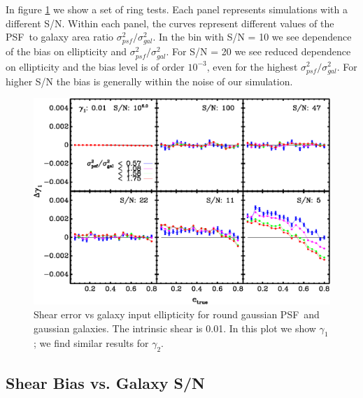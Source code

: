\documentclass[12pt,preprint]{aastex}
\newcommand{\aratio}{\ensuremath{\sigma^2_{psf}/\sigma^2_{gal}}}
\newcommand{\psf}{PSF}
\newcommand{\Rshear}{\ensuremath{\mathcal{R}}}
\newcommand{\rfracerr}{\ensuremath{\Delta \Rshear/\Rshear}}
\begin{document}
In figure \ref{fig:set-e-gg01} we show a set of ring tests.  Each panel
represents simulations with a different S/N.  Within each panel, the curves
represent different values of the \psf\ to galaxy area ratio \aratio.  In the bin
with S/N = 10 we see dependence of the bias on ellipticity and \aratio.  For
S/N = 20 we see reduced dependence on ellipticity and the bias level is of
order $10^{-3}$, even for the highest \aratio.  For higher S/N the bias is
generally within the noise of our simulation.

\begin{figure}[t] \centering
 \centering 
 \includegraphics[scale=1]{figures/set-e-gg01-yr-0.005-0.005-vs-e.eps}

 \caption{Shear error vs galaxy input ellipticity for round gaussian \psf\ and
 gaussian galaxies. The intrinsic shear is 0.01.  In this plot we show
 $\gamma_1$; we find similar results for $\gamma_2$.  \label{fig:set-e-gg01}}

\end{figure}



\subsection{Shear Bias vs. Galaxy S/N}
\end{document}
